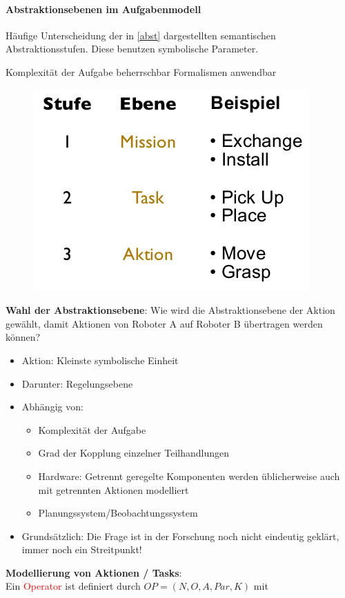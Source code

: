\paragraph*{Abstraktionsebenen im Aufgabenmodell}
Häufige Unterscheidung der in \autoref{abst} dargestellten semantischen Abstraktionsstufen. Diese benutzen symbolische Parameter.
\begin{itemize}
\ita Komplexität der Aufgabe beherrschbar
\ita Formalismen anwendbar
\end{itemize}
\begin{figure}[h!]\centering 
\includegraphics[width=0.3\linewidth]{figures/ch02_abst.png}
\caption{}
\label{abst}
\end{figure}
\textbf{Wahl der Abstraktionsebene}: Wie wird die Abstraktionsebene der Aktion gewählt, damit Aktionen von Roboter A auf Roboter B übertragen werden können?
\begin{itemize}
\item Aktion: Kleinste symbolische Einheit
\item Darunter: Regelungsebene
\item Abhängig von:
\begin{itemize}
\item Komplexität der Aufgabe
\item Grad der Kopplung einzelner Teilhandlungen
\item Hardware: Getrennt geregelte Komponenten werden üblicherweise auch mit getrennten Aktionen modelliert
\item Planungssystem/Beobachtungssystem
\end{itemize}
\item Grundsätzlich: Die Frage ist in der Forschung noch nicht eindeutig geklärt, immer noch ein Streitpunkt!
\end{itemize}
\textbf{Modellierung von Aktionen / Tasks}:\\
Ein \textcolor{red}{Operator} ist definiert durch $OP = (N, O, A, Par, K)$ mit
